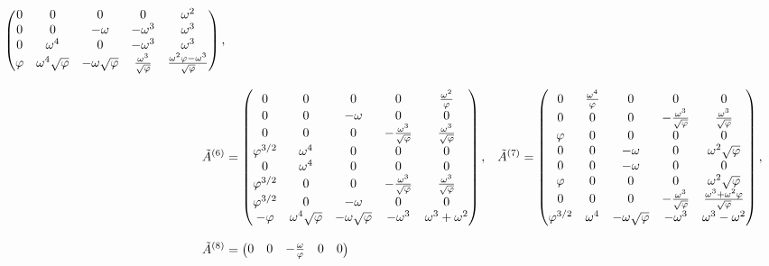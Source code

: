 \begin{align}
\begin{pmatrix}
    0 & 0 & 0 & 0 & \omega^2 \\
    0 & 0 & -\omega & -\omega^3 & \omega^3 \\
    0 & \omega^4 & 0 & -\omega^3 & \omega^3 \\
    \varphi & \omega^4 \sqrt{\varphi} & -\omega\sqrt{\varphi} & \frac{\omega^3}{\sqrt{\varphi}} & \frac{\omega^2 \varphi-\omega^3}{\sqrt{\varphi}} \\
  \end{pmatrix}, \notag \\[2ex]
  \tilde{A}^{(6)} &= \begin{pmatrix}
    0 & 0 & 0 & 0 & \frac{\omega^2}{\varphi} \\
    0 & 0 & -\omega & 0 & 0 \\
    0 & 0 & 0 & -\frac{\omega^3}{\sqrt{\varphi}} & \frac{\omega^3}{\sqrt{\varphi}} \\
    \varphi^{3/2} & \omega^4 & 0 & 0 & 0 \\
    0 & \omega^4 & 0 & 0 & 0 \\
    \varphi^{3/2} & 0 & 0 & -\frac{\omega^3}{\sqrt{\varphi}} & \frac{\omega^3}{\sqrt{\varphi}} \\
    \varphi^{3/2} & 0 & -\omega & 0 & 0 \\
    -\varphi & \omega^4 \sqrt{\varphi} & -\omega\sqrt{\varphi} & -\omega^3 & \omega^3+\omega^2 \\
  \end{pmatrix}, &
  \tilde{A}^{(7)} &= \begin{pmatrix}
    0 & \frac{\omega^4}{\varphi} & 0 & 0 & 0 \\
    0 & 0 & 0 & -\frac{\omega^3}{\sqrt{\varphi}} & \frac{\omega^3}{\sqrt{\varphi}} \\
    \varphi & 0 & 0 & 0 & 0 \\
    0 & 0 & -\omega & 0 & \omega^2 \sqrt{\varphi} \\
    0 & 0 & -\omega & 0 & 0 \\
    \varphi & 0 & 0 & 0 & \omega^2 \sqrt{\varphi} \\
    0 & 0 & 0 & -\frac{\omega^3}{\sqrt{\varphi}} & \frac{\omega^3+\omega^2 \varphi}{\sqrt{\varphi}} \\
    \varphi^{3/2} & \omega^4 & -\omega\sqrt{\varphi} & -\omega^3 & \omega^3-\omega^2 \\
  \end{pmatrix}, \notag \\[2ex]
  \tilde{A}^{(8)} &= \begin{pmatrix}
    0 & 0 & -\frac{\omega}{\varphi} & 0 & 0 \\

\end{pmatrix}
\end{align}
